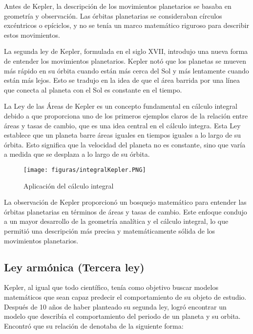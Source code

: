 \documentclass[journal]{IEEEtran}
\begin{document}
Antes de Kepler, la descripción de los movimientos planetarios se basaba en geometría y observación. Las órbitas planetarias se consideraban círculos excéntricos o epíciclos, y no se tenía un marco matemático riguroso para describir estos movimientos.

La segunda ley de Kepler, formulada en el siglo XVII, introdujo una nueva forma de entender los movimientos planetarios. Kepler notó que los planetas se mueven más rápido en su órbita cuando están más cerca del Sol y más lentamente cuando están más lejos. Esto se tradujo en la idea de que el área barrida por una línea que conecta al planeta con el Sol es constante en el tiempo.

La Ley de las Áreas de Kepler es un concepto fundamental en cálculo integral debido a que proporciona uno de los primeros ejemplos claros de la relación entre áreas y tasas de cambio, que es una idea central en el cálculo integra. Esta Ley establece que un planeta barre áreas iguales en tiempos iguales a lo largo de su órbita. Esto significa que la velocidad del planeta no es constante, sino que varía a medida que se desplaza a lo largo de su órbita. 

\begin{figure} [h]
    \centering
    \texttt{[image: figuras/integralKepler.PNG]}
    \caption{Aplicación del cálculo integral}
    \label{fig:msf}
\end{figure}

La observación de Kepler proporcionó un bosquejo matemático para entender las órbitas planetarias en términos de áreas y tasas de cambio. Este enfoque condujo a un mayor desarrollo de la geometría analítica y el cálculo integral, lo que permitió una descripción más precisa y matemáticamente sólida de los movimientos planetarios. \cite{bell2003segunda}

\subsection{Ley armónica (Tercera ley)}

Kepler, al igual que todo científico, tenía como objetivo buscar modelos matemáticos que sean capaz predecir el comportamiento de su objeto de estudio. Después de 10 años de haber planteado su segunda ley, logró encontrar un modelo que describía el comportamiento del periodo de un planeta y su orbita.\vspace{1mm}
Encontró que su relación de denotaba de la siguiente forma: \vspace{1mm}
\end{document}
